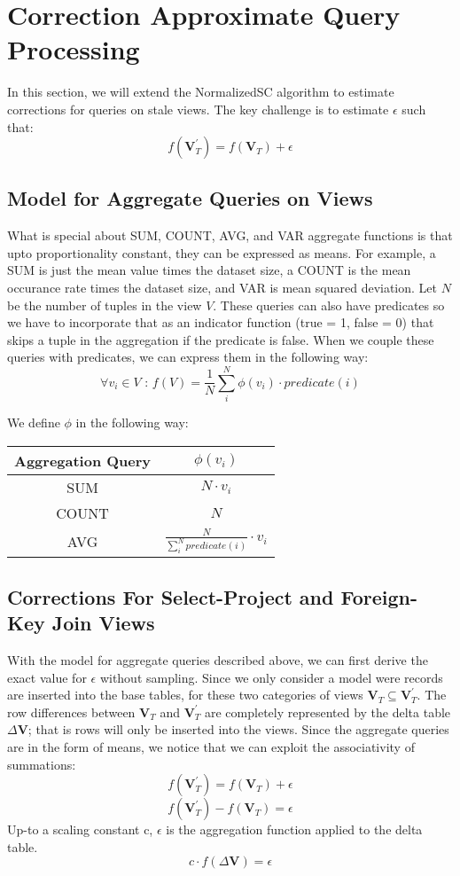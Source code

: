\section{Correction Approximate Query Processing}
In this section, we will extend the NormalizedSC algorithm to estimate
corrections for queries on stale views. The key challenge is to estimate
$\epsilon$ such that:
\[
f(\textbf{V}_{T}^{'})=f(\textbf{V}_{T})+\epsilon
\]

\subsection{Model for Aggregate Queries on Views}
What is special about SUM, COUNT, AVG, and VAR aggregate functions
is that upto proportionality constant, they can be expressed as means.
For example, a SUM is just the mean value times the dataset size, a COUNT 
is the mean occurance rate times the dataset size, and VAR is mean squared 
deviation.
Let $N$ be the number of tuples in the view $V$. 
These queries can also have predicates so we have to incorporate that
as an indicator function (true = 1, false = 0) that skips a tuple in the aggregation if the predicate is false. 
When we couple these queries with predicates, we can express them in the 
following way:
\[
\forall v_i \in V \text{ : } f(V)= \frac{1}{N} \sum_i^N \phi(v_i) \cdot predicate(i)
\]

We define $\phi$ in the following way:
\begin{center}
\begin{tabular}{|c|c|}
\hline 
Aggregation Query & $\phi(v_i)$\tabularnewline
\hline 
\hline 
SUM & $N \cdot v_i$\tabularnewline
\hline 
COUNT & $N$\tabularnewline
\hline 
AVG & $\frac{N}{\sum_i^N predicate(i)} \cdot v_i$\tabularnewline
\hline 
\end{tabular}
\par\end{center}

\subsection{Corrections For Select-Project and Foreign-Key Join Views}
With the model for aggregate queries described above, we can
first derive the exact value for $\epsilon$ without sampling.
Since we only consider a model were records are inserted into the
base tables, for these two categories of views $\textbf{V}_{T}\subseteq\textbf{V}_{T}^{'}$.
The row differences between $\textbf{V}_{T}$ and $\textbf{V}_{T}^{'}$
are completely represented by the delta table $\Delta\textbf{V}$;
that is rows will only be inserted into the views. 
Since the aggregate queries are in the form of means, we notice that we 
can exploit the associativity of summations:
\[
f(\textbf{V}_{T}^{'})=f(\textbf{V}_{T})+\epsilon
\]
\[
f(\textbf{V}_{T}^{'})-f(\textbf{V}_{T})=\epsilon
\]
Up-to a scaling constant c, $\epsilon$ is the aggregation function
applied to the delta table. 
\[
c\cdot f(\Delta\textbf{V})=\epsilon
\]


